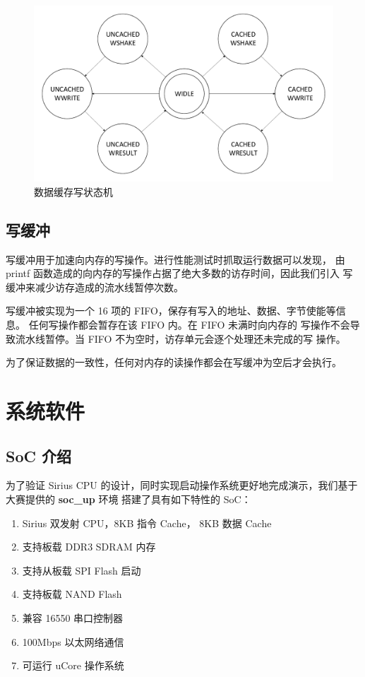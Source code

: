 \documentclass[blue,normal,cn,hide]{elegantbook}
\begin{document}
\begin{figure}[htpb]
    \centering
    \includegraphics[width=.6\textwidth]{figures/DCacheWrite}
    \caption{数据缓存写状态机}
    \label{fig:DCacheWrite}
\end{figure}


\section{写缓冲}

写缓冲用于加速向内存的写操作。进行性能测试时抓取运行数据可以发现，
由 printf 函数造成的向内存的写操作占据了绝大多数的访存时间，因此我们引入
写缓冲来减少访存造成的流水线暂停次数。

写缓冲被实现为一个 16 项的 FIFO，保存有写入的地址、数据、字节使能等信息。
任何写操作都会暂存在该 FIFO 内。在 FIFO 未满时向内存的
写操作不会导致流水线暂停。当 FIFO 不为空时，访存单元会逐个处理还未完成的写
操作。

为了保证数据的一致性，任何对内存的读操作都会在写缓冲为空后才会执行。

\chapter{系统软件}

\section{SoC 介绍}
为了验证 Sirius CPU 的设计，同时实现启动操作系统更好地完成演示，我们基于大赛提供的 \textbf{soc\_up} 环境
搭建了具有如下特性的 SoC：
\begin{enumerate}
    \item Sirius 双发射 CPU，8KB 指令 Cache， 8KB 数据 Cache
    \item 支持板载 DDR3 SDRAM 内存
    \item 支持从板载 SPI Flash 启动
    \item 支持板载 NAND Flash
    \item 兼容 16550 串口控制器
    \item 100Mbps 以太网络通信
    \item 可运行 uCore 操作系统
\end{enumerate}
\end{document}
